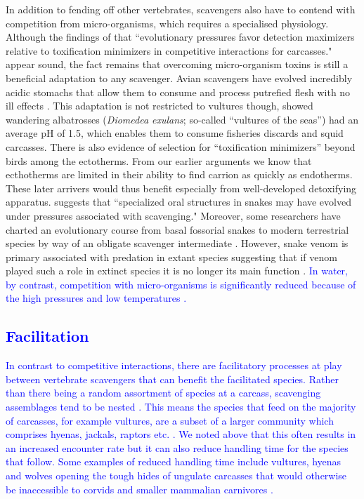 \documentclass[a4paper,12pt]{article}
\begin{document}
In addition to fending off other vertebrates, scavengers also have to contend with competition from micro-organisms, which requires a specialised physiology. 
Although the findings of \cite{shivik2006vultures} that ``evolutionary pressures favor detection maximizers relative to toxification minimizers in competitive interactions for carcasses." appear sound, the fact remains that overcoming micro-organism toxins is still a beneficial adaptation to any scavenger. 
Avian scavengers have evolved incredibly acidic stomachs that allow them to consume and process putrefied flesh with no ill effects \citep{houston1975digestive,roggenbuck2014microbiome}. 
This adaptation is not restricted to vultures though, \cite{gremillet2012vultures} showed wandering albatrosses (\textit{Diomedea exulans}; so-called ``vultures of the seas'') had an average pH of 1.5, which enables them to consume fisheries discards and squid carcasses. 
There is also evidence of selection for ``toxification minimizers'' beyond birds among the ectotherms.
From our earlier arguments we know that ecthotherms are limited in their ability to find carrion as quickly as endotherms. 
These later arrivers would thus benefit especially from well-developed detoxifying apparatus. 
\cite{shivik2006vultures} suggests that ``specialized oral structures in snakes may have evolved under pressures associated with scavenging."
Moreover, some researchers have charted an evolutionary course from basal fossorial snakes to modern terrestrial species by way of an obligate scavenger intermediate \citep{bauchot2006snakes}. However, snake venom is primary associated with predation in extant species suggesting that if venom played such a role in extinct species it is no longer its main function \citep{casewell2013complex}.
\textcolor{blue}{In water, by contrast, competition with micro-organisms is significantly reduced because of the high pressures and low temperatures \citep{beasley2012carrion}.}

\textcolor{blue}{\subsection{Facilitation}
In contrast to competitive interactions, there are facilitatory processes at play between vertebrate scavengers that can benefit the facilitated species. 
Rather than there being a random assortment of species at a carcass, scavenging assemblages tend to be nested \citep{selva2007nested}. 
This means the species that feed on the majority of carcasses, for example vultures, are a subset of a larger community which comprises hyenas, jackals, raptors etc. \citep{sebastian2016nested}. 
We noted above that this often results in an increased encounter rate but it can also reduce handling time for the species that follow. 
Some examples of reduced handling time include vultures, hyenas and wolves opening the tough hides of ungulate carcasses that would otherwise be inaccessible to corvids and smaller mammalian carnivores \citep{selva2003scavenging,moleon2015carcass}.}
\end{document}
